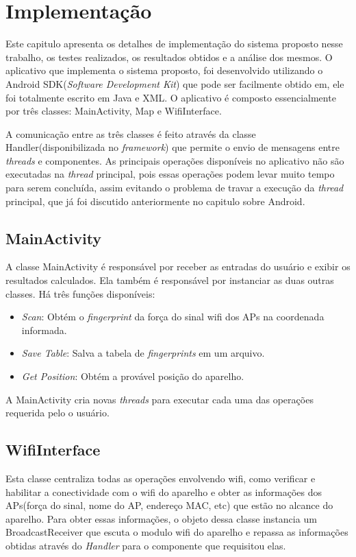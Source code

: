 \chapter{Implementação}	 
\label{implementacao}
  Este capitulo apresenta os detalhes de implementação do sistema proposto nesse trabalho, os testes realizados, os resultados obtidos 
  e a análise dos mesmos.
  O aplicativo que implementa o sistema proposto, foi desenvolvido utilizando o Android SDK(\textit{Software Development Kit}) que pode ser 
  facilmente obtido em\cite{sdk}, 
  ele foi totalmente escrito em Java e XML. O aplicativo é composto essencialmente por três  classes: MainActivity, 
  Map e WifiInterface. 
  
  A comunicação entre as três classes é feito através da classe Handler\cite{handler}(disponibilizada no \textit{framework}) que permite o envio de 
  mensagens entre \textit{threads} e componentes. As principais operações disponíveis no aplicativo não 
  são executadas na \textit{thread} principal, pois essas operações podem levar muito tempo para serem 
  concluída, assim evitando o problema de travar a execução da \textit{thread} principal, 
  que já foi discutido anteriormente no capitulo sobre Android.
  
  \section{MainActivity}
  A classe MainActivity é responsável por receber as entradas do usuário e exibir os resultados calculados.
  Ela também é responsável por instanciar as duas outras classes. Há três funções disponíveis: 
  \begin{itemize}
   \item \textit{Scan}: Obtém o \textit{fingerprint} da força do sinal wifi dos APs na coordenada informada.
   \item \textit{Save Table}: Salva a tabela de \textit{fingerprints} em um arquivo.
   \item \textit{Get Position}: Obtém a provável posição do aparelho. 
  \end{itemize}

  A MainActivity cria novas \textit{threads} para executar cada uma das operações requerida pelo o usuário.
  
  \section{WifiInterface}
  
  Esta classe centraliza todas as operações envolvendo wifi, como verificar e habilitar a conectividade
  com o wifi do aparelho e obter as informações dos APs(força do sinal, nome do AP, endereço MAC, etc) 
  que estão no alcance do aparelho. Para obter essas informações, o objeto dessa classe
  instancia um BroadcastReceiver que escuta o modulo wifi do aparelho e repassa 
  as informações obtidas através do \textit{Handler} para o componente que requisitou elas.
  
